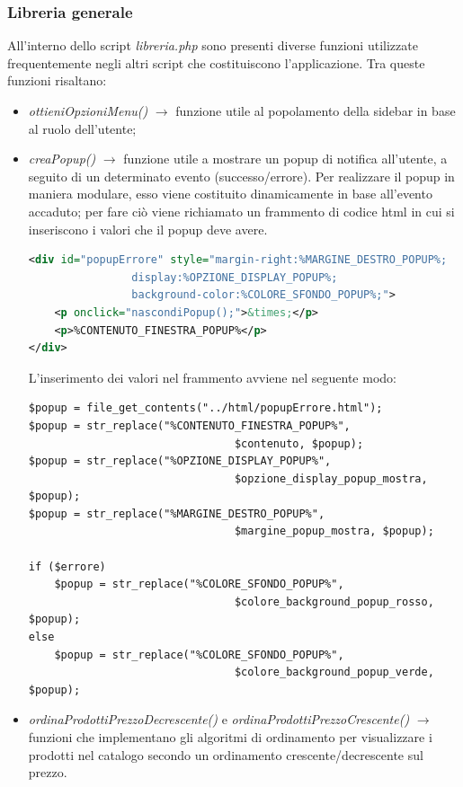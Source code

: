 \documentclass[a4paper, 14pt]{article}
\begin{document}
\begin{flushleft}
			\subsubsection{Libreria generale}
				All'interno dello script \textit{libreria.php} sono presenti diverse funzioni utilizzate frequentemente
				negli altri script che costituiscono l'applicazione.
				Tra queste funzioni risaltano:
				\begin{itemize}
					\item \textit{ottieniOpzioniMenu()} $\rightarrow$ funzione utile al popolamento della sidebar in base al ruolo dell'utente;
					\item \textit{creaPopup()} $\rightarrow$ funzione utile a mostrare un popup di notifica all'utente, a seguito
					di un determinato evento (successo/errore). Per realizzare il popup in maniera modulare, esso viene costituito dinamicamente in base all'evento accaduto; per fare ciò viene richiamato un frammento di codice html in cui si inseriscono i valori che il popup deve avere.
					\begin{lstlisting}[language=XML]
<div id="popupErrore" style="margin-right:%MARGINE_DESTRO_POPUP%; 
				display:%OPZIONE_DISPLAY_POPUP%; 
				background-color:%COLORE_SFONDO_POPUP%;">
	<p onclick="nascondiPopup();">&times;</p>
	<p>%CONTENUTO_FINESTRA_POPUP%</p>
</div>
					\end{lstlisting}
					L'inserimento dei valori nel frammento avviene nel seguente modo:
					\begin{lstlisting}[backgroundcolor=\color{coloreSfondoGrammatiche}]
$popup = file_get_contents("../html/popupErrore.html");
$popup = str_replace("%CONTENUTO_FINESTRA_POPUP%", 
								$contenuto, $popup);
$popup = str_replace("%OPZIONE_DISPLAY_POPUP%", 
								$opzione_display_popup_mostra, $popup);
$popup = str_replace("%MARGINE_DESTRO_POPUP%", 
								$margine_popup_mostra, $popup);

if ($errore)
	$popup = str_replace("%COLORE_SFONDO_POPUP%", 
								$colore_background_popup_rosso, $popup);
else 
	$popup = str_replace("%COLORE_SFONDO_POPUP%", 
								$colore_background_popup_verde, $popup);
					\end{lstlisting}
					\item \textit{ordinaProdottiPrezzoDecrescente()} e \textit{ordinaProdottiPrezzoCrescente()} $\rightarrow$ funzioni che implementano gli algoritmi di ordinamento per visualizzare i prodotti nel catalogo secondo un ordinamento crescente/decrescente sul prezzo.
				\end{itemize}

\end{flushleft}
\end{document}
